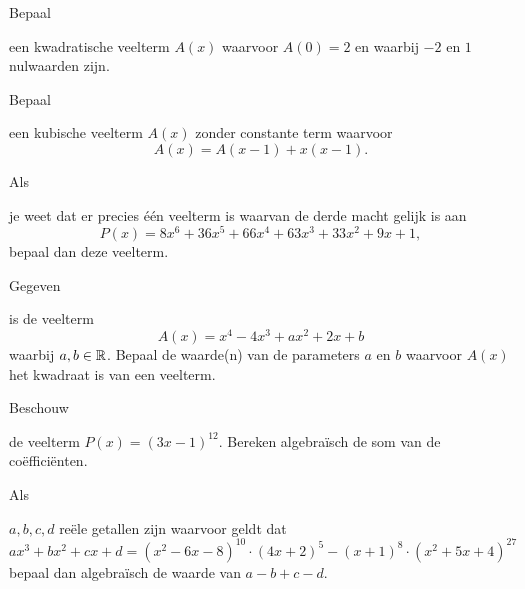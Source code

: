 \documentclass{ximera}
\begin{document}
\begin{exercise} 
\hypertarget{oef1.13}{Bepaal} een kwadratische veelterm $A(x)$ waarvoor $A(0) = 2$ en waarbij $-2$ en $1$ nulwaarden zijn.
\end{exercise} 

\begin{exercise} 
\hypertarget{oef1.14}{Bepaal} een kubische veelterm $A(x)$ zonder constante term waarvoor
\[
A(x) = A(x-1) + x(x-1).
\]
\end{exercise} 

\begin{exercise} 
\hypertarget{oef1.15}{Als} je weet dat er precies \'e\'en veelterm is waarvan de derde macht gelijk is aan 
\[
P(x) = 8x^6 + 36x^5 + 66x^4 + 63x^3 + 33x^2 + 9x + 1,
\]
bepaal dan deze veelterm.
\end{exercise} 

\begin{exercise} 
\hypertarget{oef1.16}{Gegeven} is de veelterm
\[
A(x) = x^4 - 4x^3 + ax^2 + 2x + b
\]
waarbij $a,b \in \mathbb{R}$. Bepaal de waarde(n) van de parameters $a$ en $b$ waarvoor $A(x)$ het kwadraat is van een veelterm. 
\end{exercise} 

\begin{exercise} 
\hypertarget{oef1.17}{Beschouw} de veelterm $P(x) = (3x - 1)^{12}$. Bereken algebra\"isch de som van de co\"effici\"enten. 
\end{exercise} 

\begin{exercise} 
\hypertarget{oef1.18}{Als} $a,b,c,d$ re\"ele getallen zijn waarvoor geldt dat
\[
ax^3 + bx^2 + cx + d = (x^2-6x-8)^{10}\cdot(4x+2)^5 - (x+1)^8\cdot(x^2+5x+4)^{27}
\]
bepaal dan algebra\"isch de waarde van $a-b+c-d$.
\end{exercise} 
\end{document}
